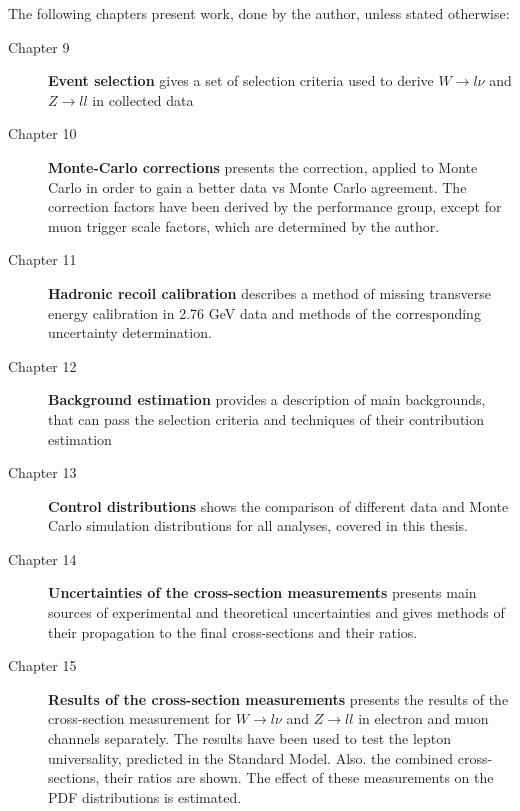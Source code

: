 The following chapters present work, done by the author, unless stated otherwise:
\begin{description}
\item [Chapter 9] \textbf{Event selection} gives a set of selection criteria used to derive $W\to l\nu$ and $Z\to ll$ in collected data
\item [Chapter 10] \textbf{Monte-Carlo corrections} presents the correction, applied to Monte Carlo in order to gain a better data vs Monte Carlo agreement. The correction factors have been derived by the performance group, except for muon trigger scale factors, which are determined by the author.
\item [Chapter 11] \textbf{Hadronic recoil calibration} describes a method of missing transverse energy calibration in 2.76 GeV data and methods of the corresponding uncertainty determination.
\item [Chapter 12] \textbf{Background estimation} provides a description of main backgrounds, that can pass the selection criteria and techniques of their contribution estimation
\item [Chapter 13] \textbf{Control distributions} shows the comparison of different data and Monte Carlo simulation distributions for all analyses, covered in this thesis.
\item [Chapter 14] \textbf{Uncertainties of the cross-section measurements} presents main sources of experimental and theoretical uncertainties and gives methods of their propagation to the final cross-sections and their ratios.
\item [Chapter 15] \textbf{Results of the cross-section measurements} presents the results of the cross-section measurement for $W\to l\nu$ and $Z\to ll$ in electron and muon channels separately. The results have been used to test the lepton universality, predicted in the Standard Model.  Also. the combined cross-sections, their ratios are shown. The effect of these measurements on the PDF distributions is estimated.
\end{description}